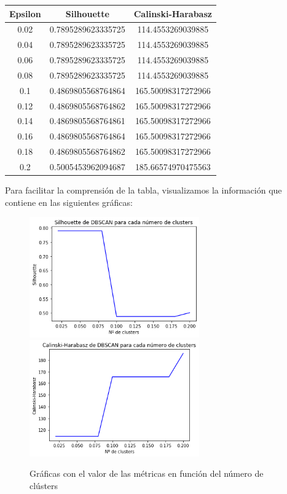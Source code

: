 \documentclass[a4]{article}
\begin{document}
\begin{center}
\begin{tabular}{|c|c|c|}
\hline
\multicolumn{1}{|c|}{\textbf{Epsilon}}& \textbf{Silhouette} & \textbf{Calinski-Harabasz}\\ \hline
  0.02  & 0.7895289623335725  & 114.4553269039885  \\ \hline
  0.04  & 0.7895289623335725  & 114.4553269039885  \\ \hline
  0.06  & 0.7895289623335725  & 114.4553269039885  \\ \hline
  0.08  & 0.7895289623335725  & 114.4553269039885  \\ \hline
  0.1   & 0.4869805568764864  & 165.50098317272966  \\ \hline
  0.12  & 0.4869805568764862  & 165.50098317272966  \\ \hline
  0.14  & 0.4869805568764861  & 165.50098317272966  \\ \hline
  0.16  & 0.4869805568764864  & 165.50098317272966  \\ \hline
  0.18  & 0.4869805568764862  & 165.50098317272966  \\ \hline
  0.2   & 0.5005453962094687  & 185.66574970475563  \\ \hline
\end{tabular}
\end{center}

Para facilitar la comprensión de la tabla, visualizamos la información que contiene en las siguientes gráficas:

\begin{figure}[H]
  \centering
  \caption{Gráficas con el valor de las métricas en función del número de clústers}
  \includegraphics[width=73mm]{imagenes/c1_dbscan_sil}
  \includegraphics[width=73mm]{imagenes/c1_dbscan_cal}
\end{figure}
\end{document}
